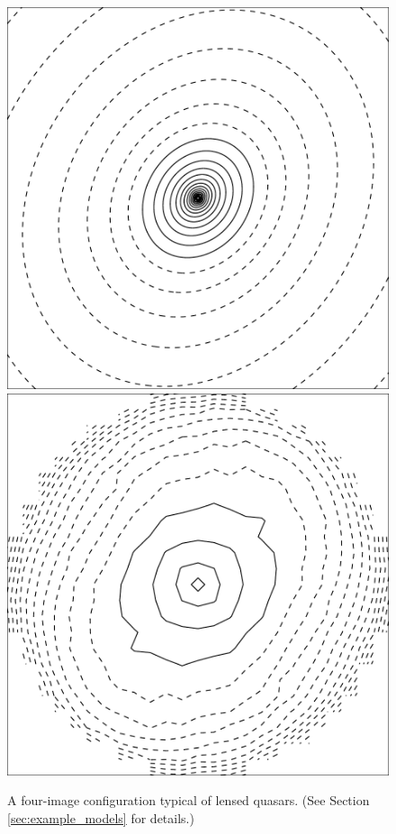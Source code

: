 \begin{figure}
  \includegraphics[width=\myplotswidth]{fig/ASW0001hpf_006915_kappa}
  \includegraphics[width=\myplotswidth]{fig/006915_mass}

  \caption[result 6915 (ASW0001hpf)]{A four-image configuration
    typical of lensed quasars. (See Section \ref{sec:example_models}
    for details.)}
  \label{fig:6915}
\end{figure}






